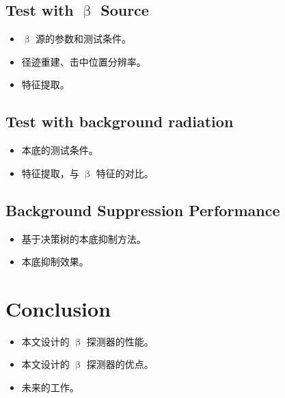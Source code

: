 \subsection{Test with $\upbeta$ Source}
\begin{itemize}
    \item $\upbeta$ 源的参数和测试条件。
    \item 径迹重建、击中位置分辨率。
    \item 特征提取。
\end{itemize}

\subsection{Test with background radiation}
\begin{itemize}
    \item 本底的测试条件。
    \item 特征提取，与 $\upbeta$ 特征的对比。
\end{itemize}

\subsection{Background Suppression Performance}
\begin{itemize}
    \item 基于决策树的本底抑制方法。
    \item 本底抑制效果。
\end{itemize}

\section{Conclusion}
\begin{itemize}
    \item 本文设计的 $\upbeta$ 探测器的性能。
    \item 本文设计的 $\upbeta$ 探测器的优点。
    \item 未来的工作。
\end{itemize}